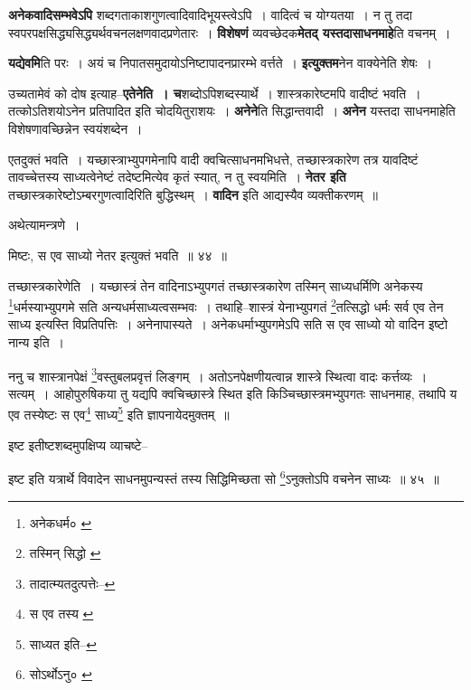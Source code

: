 \documentclass[article,12pt,a4paper]{memoir}
\begin{document}
	  \pstart \textbf{अनेकवादिसम्भवेऽपि} शब्दगताकाशगुणत्वादिवादिभूयस्त्वेऽपि । वादित्वं च योग्यतया । न तु तदा स्वपरपक्षसिद्ध्यसिद्ध्यर्थवचनलक्षणवादप्रणेतारः । \textbf{विशेषणं} व्यवच्छेदक\textbf{मेतद् यस्तदासाधनमाहे}ति वचनम् ।
	\pend
      

	  \pstart \textbf{यद्येवमि}ति परः । अयं च निपातसमुदायोऽनिष्टापादनप्रारम्भे वर्त्तते । \textbf{इत्युक्तम}नेन वाक्येनेति शेषः ।
	\pend
      

	  \pstart उच्यतामेवं को दोष इत्याह--\textbf{एतेनेति । च}शब्दोऽपिशब्दस्यार्थे । शास्त्रकारेष्टमपि वादीष्टं भवति । तत्कोऽतिशयोऽनेन प्रतिपादित इति चोदयितुराशयः । \textbf{अनेने}ति सिद्धान्तवादी । \textbf{अनेन} यस्तदा साधनमाहेति विशेषणावच्छिन्नेन स्वयंशब्देन ।
	\pend
      

	  \pstart एतदुक्तं भवति । यच्छास्त्राभ्युपगमेनापि वादी क्वचित्साधनमभिधत्ते, तच्छास्त्रकारेण तत्र यावदिष्टं तावच्चेत्तस्य साध्यत्वेनेष्टं तदेष्टमित्येव कृतं स्यात्, न तु स्वयमिति । \textbf{नेतर इति} तच्छास्त्रकारेष्टोऽम्बरगुणत्वादिरिति बुद्धिस्थम् । \textbf{वादिन} इति आद्यस्यैव व्यक्तीकरणम् ॥
	\pend
      

	  \pstart अथेत्यामन्त्रणे ।
	\pend
      \leavevmode{}
	  \bigskip
	  \begingroup
	
	  \bigskip
	  \begingroup
	

	  \pstart मिष्टः, स एव साध्यो नेतर इत्युक्तं भवति ॥ ४४ ॥
	\pend
      
	  \endgroup
	 

	  \pstart तच्छास्त्रकारेणेति । यच्छास्त्रं तेन वादिनाऽभ्युपगतं तच्छास्त्रकारेण तस्मिन् साध्यधर्मिणि अनेकस्य \footnote{अनेकधर्म० \cite{dp-msC}}धर्मस्याभ्युपगमे सति अन्यधर्मसाध्यत्वसम्भवः । तथाहि--शास्त्रं येनाभ्युपगतं \footnote{तस्मिन् सिद्धो \cite{dp-edE}}तत्सिद्धो धर्मः सर्व एव तेन साध्य इत्यस्ति विप्रतिपत्तिः । अनेनापास्यते । अनेकधर्माभ्युपगमेऽपि सति स एव साध्यो यो वादिन इष्टो नान्य इति ।
	\pend
       

	  \pstart ननु च शास्त्रानपेक्षं \footnote{तादात्म्यतदुत्पत्तेः--\cite{dp-msD-n}}वस्तुबलप्रवृत्तं लिङ्गम् । अतोऽनपेक्षणीयत्वान्न शास्त्रे स्थित्वा वादः कर्त्तव्यः । सत्यम् । आहोपुरुषिकया तु यद्यपि क्वचिच्छास्त्रे स्थित इति किञ्चिच्छास्त्रमभ्युपगतः साधनमाह, तथापि य एव तस्येष्टः स एव\footnote{स एव तस्य \cite{dp-msA} \cite{dp-edE}} साध्य\footnote{साध्यत इति--\cite{dp-msC}} इति ज्ञापनायेदमुक्तम् ॥
	\pend
       

	  \pstart इष्ट इतीष्टशब्दमुपक्षिप्य व्याचष्टे--
	\pend
       
	  \bigskip
	  \begingroup
	

	  \pstart इष्ट इति यत्रार्थे विवादेन साधनमुपन्यस्तं तस्य सिद्धिमिच्छता सो \footnote{सोऽर्थोऽनु० \cite{dp-msC}}ऽनुक्तोऽपि वचनेन साध्यः ॥ ४५ ॥
	\pend
      
\end{document}
